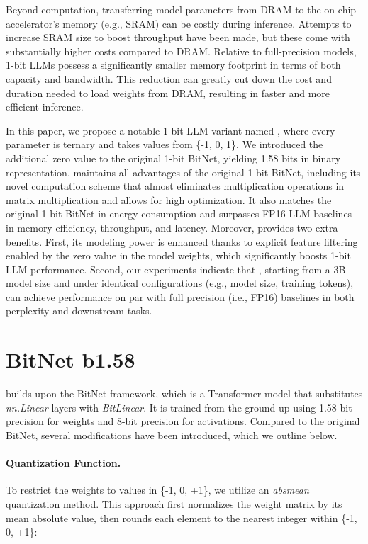 Beyond computation, transferring model parameters from DRAM to the on-chip accelerator's memory (e.g., SRAM) can be costly during inference. Attempts to increase SRAM size to boost throughput have been made, but these come with substantially higher costs compared to DRAM. Relative to full-precision models, 1-bit LLMs possess a significantly smaller memory footprint in terms of both capacity and bandwidth. This reduction can greatly cut down the cost and duration needed to load weights from DRAM, resulting in faster and more efficient inference.

In this paper, we propose a notable 1-bit LLM variant named \textbf{}, where every parameter is ternary and takes values from \{-1, 0, 1\}. We introduced the additional zero value to the original 1-bit BitNet, yielding 1.58 bits in binary representation.  maintains all advantages of the original 1-bit BitNet, including its novel computation scheme that almost eliminates multiplication operations in matrix multiplication and allows for high optimization. It also matches the original 1-bit BitNet in energy consumption and surpasses FP16 LLM baselines in memory efficiency, throughput, and latency. Moreover,  provides two extra benefits. First, its modeling power is enhanced thanks to explicit feature filtering enabled by the zero value in the model weights, which significantly boosts 1-bit LLM performance. Second, our experiments indicate that , starting from a 3B model size and under identical configurations (e.g., model size, training tokens), can achieve performance on par with full precision (i.e., FP16) baselines in both perplexity and downstream tasks.

\section{BitNet b1.58}

 builds upon the BitNet framework, which is a Transformer model that substitutes \emph{nn.Linear} layers with \emph{BitLinear}. It is trained from the ground up using 1.58-bit precision for weights and 8-bit precision for activations. Compared to the original BitNet, several modifications have been introduced, which we outline below.

\paragraph{Quantization Function.} To restrict the weights to values in \{-1, 0, +1\}, we utilize an \emph{absmean} quantization method. This approach first normalizes the weight matrix by its mean absolute value, then rounds each element to the nearest integer within \{-1, 0, +1\}:

